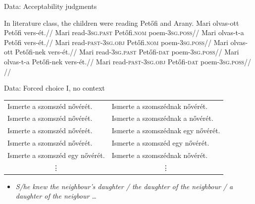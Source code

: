\documentclass[12pt]{beamer}
\begin{document}
\begin{frame}{Data: Acceptability judgments}

    \pex In literature class, the children were reading Petőfi and Arany.
        \a
            \begingl
                \gla    Mari olvas-ott Petőfi vers-ét.//
                \glb    Mari read-\textsc{3sg.past} Petőfi.\textsc{nom} poem-\textsc{3sg.poss}//
            \endgl
        \a
            \begingl
                \gla    Mari olvas-t-a Petőfi vers-ét.//
                \glb    Mari read-\textsc{past-\alert{3sg.obj}} Petőfi.\textsc{nom} poem-\textsc{3sg.poss}//
            \endgl
        \a
            \begingl
                \gla    Mari olvas-ott Petőfi-nek vers-ét.//
                \glb    Mari read-\textsc{3sg.past} Petőfi-\textsc{\textcolor{red!70!black}{dat}} poem-\textsc{3sg.poss}//
            \endgl
        \a
            \begingl
                \gla    Mari olvas-t-a Petőfi-nek vers-ét.//
                \glb    Mari read-\textsc{past-\alert{3sg.obj}} Petőfi-\textsc{\textcolor{red!70!black}{dat}} poem-\textsc{3sg.poss}//
                \glft   {}//
            \endgl
    \xe

\end{frame}

\begin{frame}{Data: Forced choice I, no context}

\hspace{-.5cm}\begin{tabulary}{1\linewidth}{ll}
Ismerte a szomszéd nővérét.        & Ismerte a szomszéd\textcolor{red!70!black}{nak} nővérét.\\
Ismerte a szomszéd nővérét.        & Ismerte a szomszéd\textcolor{red!70!black}{nak} \textcolor{green!70!black}{a} nővérét.\\
Ismerte a szomszéd nővérét.        & Ismerte a szomszéd\textcolor{red!70!black}{nak} \alert{egy} nővérét.\\
Ismerte a szomszéd nővérét.        & Ismerte a szomszéd \alert{egy} nővérét.\\
Ismerte a szomszéd \alert{egy} nővérét.    & Ismerte a szomszéd\textcolor{red!70!black}{nak} nővérét.\\
 & \\
\end{tabulary}

\begin{itemize}
    \item \emph{S/he knew the neighbour's daughter / \textcolor{green!70!black}{the} daughter \textcolor{red!70!black}{of the} neighbour / \alert{a} daughter \textcolor{red!70!black}{of the} neigbour \dots}
\end{itemize}

\end{frame}
\end{document}
